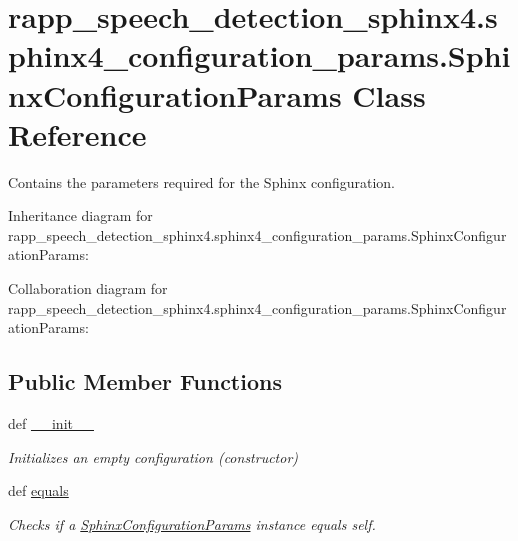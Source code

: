 \hypertarget{classrapp__speech__detection__sphinx4_1_1sphinx4__configuration__params_1_1SphinxConfigurationParams}{\section{rapp\-\_\-speech\-\_\-detection\-\_\-sphinx4.\-sphinx4\-\_\-configuration\-\_\-params.\-Sphinx\-Configuration\-Params Class Reference}
\label{classrapp__speech__detection__sphinx4_1_1sphinx4__configuration__params_1_1SphinxConfigurationParams}
}


Contains the parameters required for the Sphinx configuration.  




Inheritance diagram for rapp\-\_\-speech\-\_\-detection\-\_\-sphinx4.\-sphinx4\-\_\-configuration\-\_\-params.\-Sphinx\-Configuration\-Params\-:


Collaboration diagram for rapp\-\_\-speech\-\_\-detection\-\_\-sphinx4.\-sphinx4\-\_\-configuration\-\_\-params.\-Sphinx\-Configuration\-Params\-:
\subsection*{Public Member Functions}
\begin{DoxyCompactItemize}
\item 
def \hyperlink{classrapp__speech__detection__sphinx4_1_1sphinx4__configuration__params_1_1SphinxConfigurationParams_a1a4d416054657547de8dddfa9dc2f079}{\-\_\-\-\_\-init\-\_\-\-\_\-}
\begin{DoxyCompactList}\small\item\em Initializes an empty configuration (constructor) \end{DoxyCompactList}\item 
def \hyperlink{classrapp__speech__detection__sphinx4_1_1sphinx4__configuration__params_1_1SphinxConfigurationParams_a1d4174514a206ef23357977ee5a5390e}{equals}
\begin{DoxyCompactList}\small\item\em Checks if a \hyperlink{classrapp__speech__detection__sphinx4_1_1sphinx4__configuration__params_1_1SphinxConfigurationParams}{Sphinx\-Configuration\-Params} instance equals self. \end{DoxyCompactList}\end{DoxyCompactItemize}
